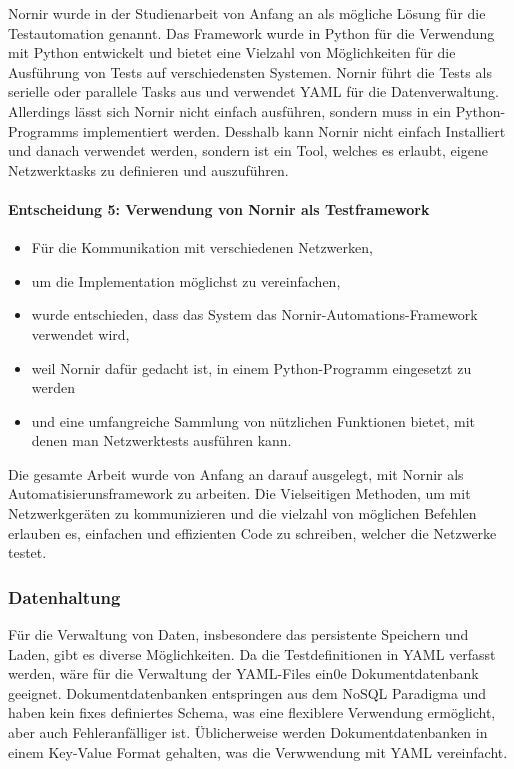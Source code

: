 \documentclass[
	ngerman,
	toc=listof, %
	toc=bibliography, %
	footnotes=multiple, %
	parskip=half, %
	numbers=noendperiod %
]{scrartcl}
\begin{document}
		Nornir wurde in der Studienarbeit von Anfang an als mögliche Lösung für die Testautomation genannt.
		Das Framework wurde in Python für die Verwendung mit Python entwickelt und bietet eine Vielzahl von Möglichkeiten für die Ausführung von Tests auf verschiedensten Systemen.
		Nornir führt die Tests als serielle oder parallele Tasks aus und verwendet YAML für die Datenverwaltung.
		Allerdings lässt sich Nornir nicht einfach ausführen, sondern muss in ein Python-Programms implementiert werden.
		Desshalb kann Nornir nicht einfach Installiert und danach verwendet werden, sondern ist ein Tool, welches es erlaubt, eigene Netzwerktasks zu definieren und auszuführen.



		\paragraph{Entscheidung 5: Verwendung von Nornir als Testframework}
		\begin{itemize}
			\item Für die Kommunikation mit verschiedenen Netzwerken,
			\item um die Implementation möglichst zu vereinfachen,
			\item wurde entschieden, dass das System das Nornir-Automations-Framework verwendet wird,
			\item weil Nornir dafür gedacht ist, in einem Python-Programm eingesetzt zu werden
			\item und eine umfangreiche Sammlung von nützlichen Funktionen bietet, mit denen man Netzwerktests ausführen kann.
		\end{itemize}

		Die gesamte Arbeit wurde von Anfang an darauf ausgelegt, mit Nornir als Automatisierunsframework zu arbeiten.
		Die Vielseitigen Methoden, um mit Netzwerkgeräten zu kommunizieren und die vielzahl von möglichen Befehlen erlauben es, einfachen und effizienten Code zu schreiben, welcher die Netzwerke testet.
		\newpage

		\subsubsection{Datenhaltung}
		Für die Verwaltung von Daten, insbesondere das persistente Speichern und Laden, gibt es diverse Möglichkeiten.
		Da die Testdefinitionen in YAML verfasst werden, wäre für die Verwaltung der YAML-Files ein0e Dokumentdatenbank geeignet.
		Dokumentdatenbanken entspringen aus dem NoSQL Paradigma und haben kein fixes definiertes Schema, was eine flexiblere Verwendung ermöglicht, aber auch Fehleranfälliger ist.
		Üblicherweise werden Dokumentdatenbanken in einem Key-Value Format gehalten, was die Verwwendung mit YAML vereinfacht.
\end{document}
